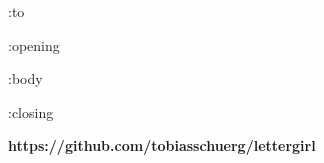 \documentclass[version=last, Briefvorlage]{scrlttr2}
\begin{document}
	\begin{letter}
		{ :to }
		\opening{ :opening }
		:body
		\closing{ :closing }

		\newpage
		\thispagestyle{empty} %
		\null
		\vfill
		\begin{center}
			\textbf{https://github.com/tobiasschuerg/lettergirl}
		\end{center}
		\vfill
	\end{letter}
\end{document}
